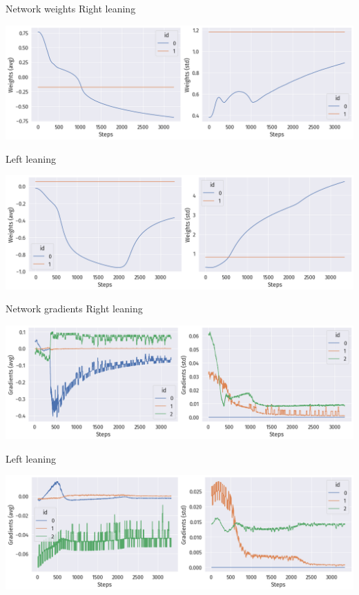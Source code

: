 \documentclass[bigger]{beamer}
\begin{document}
\begin{frame}[label={sec:org54445f7}]{Network weights}
\centering
\scriptsize
Right leaning
\vspace{-1em}
\begin{center}
\includegraphics[width=\textwidth]{img/DRL-weights.png}
\end{center}

\vspace{-1em}
\centering
\scriptsize
Left leaning
\vspace{-1em}
\begin{center}
\includegraphics[width=\textwidth]{img/DRL-weights2.png}
\end{center}
\end{frame}
\begin{frame}[label={sec:org1a04b2e}]{Network gradients}
\centering
\scriptsize
Right leaning
\vspace{-1em}
\begin{center}
\includegraphics[width=\textwidth]{img/DRL-gradients.png}
\end{center}

\vspace{-1em}
\centering
\scriptsize
Left leaning
\vspace{-1em}
\begin{center}
\includegraphics[width=\textwidth]{img/DRL-gradients2.png}
\end{center}
\end{frame}
\end{document}
